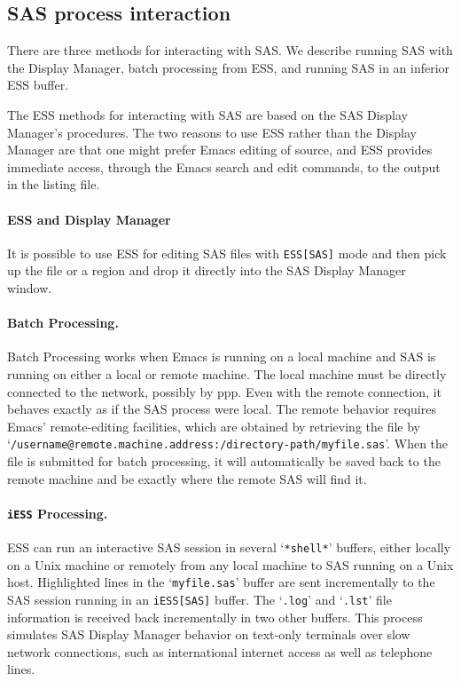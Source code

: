 \documentclass{article}
\newcommand{\stexttt}[1]{{\small\texttt{#1}}}
\newcommand{\ssf}[1]{{\small\sf{#1}}}
\newcommand{\file}[1]{`\stexttt{#1}'}
\begin{document}
\subsection{SAS process interaction}
\label{sec:SAS:proc}

There are three methods for interacting with SAS.  We describe running
SAS with the Display Manager, batch processing from ESS, and running
SAS in an inferior ESS buffer.

The ESS methods for interacting with SAS are based on the SAS Display
Manager's procedures.  The two reasons to use ESS rather than the
Display Manager are that one might prefer Emacs editing of source, and
ESS provides immediate access, through the Emacs search and edit
commands, to the output in the listing file.

\paragraph{ESS and Display Manager}
It is possible to use ESS for editing SAS files with
\stexttt{ESS[SAS]} mode and then pick up the file or a region and drop
it directly into the SAS Display Manager \ssf{Program Editor} window.

\paragraph{Batch Processing.}
Batch Processing works when Emacs is running on a local machine and
SAS is running on either a local or remote machine.  The local machine
must be directly connected to the network, possibly by ppp.  Even with
the remote connection, it behaves exactly as if the SAS process were
local.  The remote behavior requires Emacs' remote-editing facilities,
which are obtained by retrieving the file by
\file{/username@remote.machine.address:/directory-path/myfile.sas}.
When the file is submitted for batch processing, it will automatically
be saved back to the remote machine and be exactly where the remote
SAS will find it.

\paragraph{\stexttt{iESS} Processing.}
ESS can run an interactive SAS session in several \file{*shell*}
buffers, either locally on a Unix machine or remotely from any local
machine to SAS running on a Unix host.  Highlighted lines in the
\file{myfile.sas} buffer are sent incrementally to the SAS session
running in an \stexttt{iESS[SAS]} buffer.  The \file{.log} and
\file{.lst} file information is received back incrementally in two
other buffers.  This process simulates SAS Display Manager behavior on
text-only terminals over slow network connections, such as
international internet access as well as telephone lines.
\end{document}
